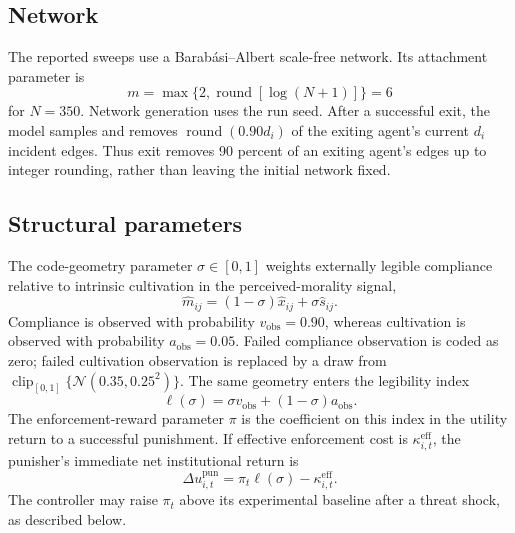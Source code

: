 \subsection{Network}

The reported sweeps use a Barab\'asi--Albert scale-free network. Its attachment parameter is
\begin{equation}
 m=\max\{2,\operatorname{round}[\log(N+1)]\}=6
\end{equation}
for \(N=350\). Network generation uses the run seed. After a successful exit, the model samples and removes \(\operatorname{round}(0.90d_i)\) of the exiting agent's current \(d_i\) incident edges. Thus exit removes 90 percent of an exiting agent's edges up to integer rounding, rather than leaving the initial network fixed.

\subsection{Structural parameters}

The code-geometry parameter \(\sigma\in[0,1]\) weights externally legible compliance relative to intrinsic cultivation in the perceived-morality signal,
\begin{equation}
 \widehat m_{ij}=(1-\sigma)\widehat x_{ij}+\sigma\widehat s_{ij}.
\end{equation}
Compliance is observed with probability \(v_{\mathrm{obs}}=0.90\), whereas cultivation is observed with probability \(a_{\mathrm{obs}}=0.05\). Failed compliance observation is coded as zero; failed cultivation observation is replaced by a draw from \(\operatorname{clip}_{[0,1]}\{\mathcal{N}(0.35,0.25^2)\}\). The same geometry enters the legibility index
\begin{equation}
 \ell(\sigma)=\sigma v_{\mathrm{obs}}+(1-\sigma)a_{\mathrm{obs}}.
\end{equation}
The enforcement-reward parameter \(\pi\) is the coefficient on this index in the utility return to a successful punishment. If effective enforcement cost is \(\kappa_{i,t}^{\mathrm{eff}}\), the punisher's immediate net institutional return is
\begin{equation}
 \Delta u_{i,t}^{\mathrm{pun}}=\pi_t\ell(\sigma)-\kappa_{i,t}^{\mathrm{eff}}.
\end{equation}
The controller may raise \(\pi_t\) above its experimental baseline after a threat shock, as described below.

